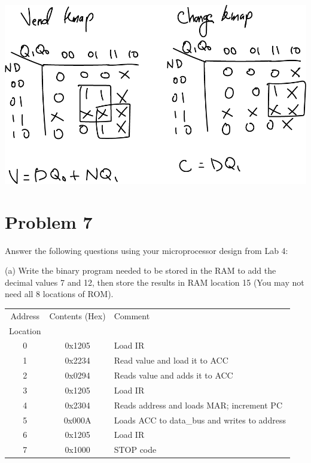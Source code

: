 \documentclass{article}
\begin{document}
    \begin{center}
        \includegraphics[scale=0.35]{Q6_OutKmaps.png}
    \end{center}

    
    \section*{Problem 7}

    Answer the following questions using your microprocessor design from Lab 4:

    (a) Write the binary program needed to be stored in the RAM to add the decimal values 
    7 and 12, then store the results in RAM location 15 (You may not need all 8 locations 
    of ROM).

    \begin{center}
        \begin{tabular} {|c|c|l|}
            \hline
            Address & Contents (Hex) & Comment \\
            Location & & \\
            \hline
            0 & 0x1205 & Load IR\\
            1 & 0x2234 & Read value and load it to ACC\\
            2 & 0x0294 & Reads value and adds it to ACC \\
            3 & 0x1205 & Load IR \\
            4 & 0x2304 & Reads address and loads MAR; increment PC\\
            5 & 0x000A & Loads ACC to data\_bus and writes to address\\
            6 & 0x1205 & Load IR \\
            7 & 0x1000 & STOP code \\
            \hline
        \end{tabular}
    \end{center}
\end{document}
